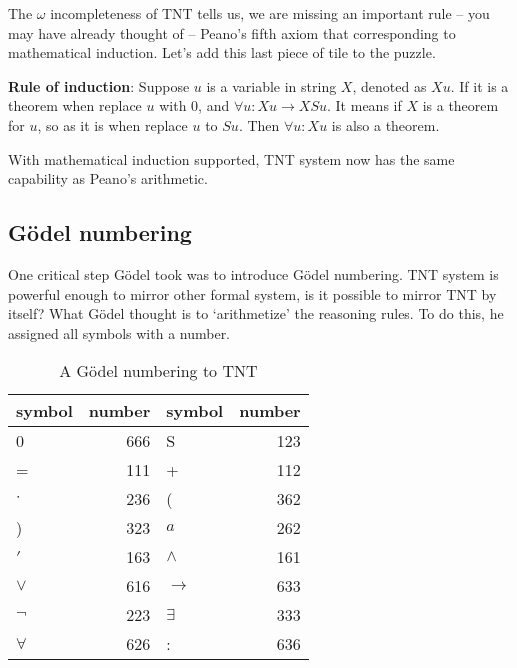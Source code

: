 \documentclass[b5paper]{article}
\begin{document}
The $\omega$ incompleteness of TNT tells us, we are missing an important rule -- you may have already thought of -- Peano's fifth axiom that corresponding to mathematical induction. Let's add this last piece of tile to the puzzle.

\textbf{Rule of induction}: Suppose $u$ is a variable in string $X$, denoted as $X{u}$. If it is a theorem when replace $u$ with 0, and $\forall u: X{u} \to X{Su}$. It means if $X$ is a theorem for $u$, so as it is when replace $u$ to $Su$. Then $\forall u: X{u}$ is also a theorem.

With mathematical induction supported, TNT system now has the same capability as Peano's arithmetic.

\begin{Exercise}\label{ex:math-induction}
\end{Exercise}

\begin{Answer}[ref = {ex:math-induction}]
\end{Answer}

\subsection{Gödel numbering}
One critical step Gödel took was to introduce Gödel numbering. TNT system is powerful enough to mirror other formal system, is it possible to mirror TNT by itself? What Gödel thought is to `arithmetize' the reasoning rules. To do this, he assigned all symbols with a number.

\begin{table}[htbp]
\centering
\begin{tabular}{|l|r||l|r|}
\hline
\textbf{symbol} & \textbf{number} & \textbf{symbol} & \textbf{number} \\
\hline
0 & 666 & S & 123 \\
\hline
= & 111 & + & 112 \\
\hline
$\cdot$ & 236 & ( & 362 \\
\hline
) & 323 & $a$ & 262 \\
\hline
$'$ & 163 & $\land$ & 161 \\
\hline
$\lor$ & 616 & $\to$ & 633 \\
\hline
$\lnot$ & 223 & $\exists$ & 333 \\
\hline
$\forall$ & 626 & : & 636 \\
\hline
\end{tabular}
\caption{A Gödel numbering to TNT}
\end{table}
\end{document}
